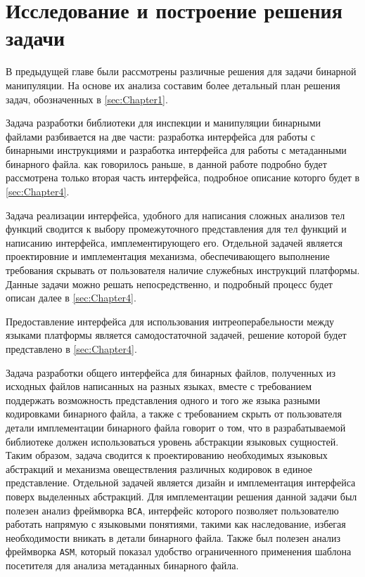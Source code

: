 \section{Исследование и построение решения задачи}
\label{sec:Chapter3} 

\sloppy

В предыдущей главе были рассмотрены различные решения для задачи бинарной манипуляции. На основе их анализа составим более детальный план решения задач, обозначенных в \autoref{sec:Chapter1}.

Задача разработки библиотеки для инспекции и манипуляции бинарными файлами разбивается на две части: разработка интерфейса для работы с бинарными инструкциями и разработка интерфейса для работы с метаданными бинарного файла. как говорилось раньше, в данной работе подробно будет рассмотрена только вторая часть интерфейса, подробное описание которго будет в \autoref{sec:Chapter4}.

Задача реализации интерфейса, удобного для написания сложных анализов тел функций сводится к выбору промежуточного представления для тел функций и написанию интерфейса, имплементирующего его. Отдельной задачей является проектировние и имплементация механизма, обеспечивающего выполнение требования скрывать от пользователя наличие служебных инструкций платформы. Данные задачи можно решать непосредственно, и подробный процесс будет описан далее в \autoref{sec:Chapter4}.

Предоставление интерфейса для использования интреоперабельности между языками платформы является самодостаточной задачей, решение которой будет представлено в \autoref{sec:Chapter4}.

Задача разработки общего интерфейса для бинарных файлов, полученных из исходных файлов написанных на разных языках, вместе с требованием поддержать возможность представления одного и того же языка разными кодировками бинарного файла, а также с требованием скрыть от пользователя детали имплементации бинарного файла говорит о том, что в разрабатываемой библиотеке должен использоваться уровень абстракции языковых сущностей. Таким образом, задача сводится к проектированию необходимых языковых абстракций и механизма овеществления различных кодировок в единое представление. Отдельной задачей является дизайн и имплементация интерфейса поверх выделенных абстракций. Для имплементации решения данной задачи был полезен анализ фреймворка \texttt{BCA}, интерфейс которого позволяет пользователю работать напрямую с языковыми понятиями, такими как наследование, избегая необходимости вникать в детали бинарного файла. Также был полезен анализ фреймворка \texttt{ASM}, который показал удобство ограниченного применения шаблона посетителя для анализа метаданных бинарного файла.

\newpage
